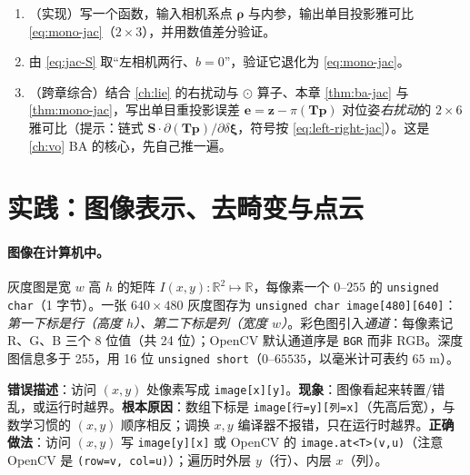 \begin{practice}
\begin{enumerate}
  \item （实现）写一个函数，输入相机系点 $\boldsymbol\rho$ 与内参，输出单目投影雅可比 \cref{eq:mono-jac}（$2\times3$），并用数值差分验证。
  \item 由 \cref{eq:jac-S} 取“左相机两行、$b=0$”，验证它退化为 \cref{eq:mono-jac}。
  \item （跨章综合）结合 \cref{ch:lie} 的右扰动与 $\odot$ 算子、本章 \cref{thm:ba-jac} 与 \cref{thm:mono-jac}，写出单目重投影误差 $\mathbf{e}=\mathbf{z}-\pi(\mathbf{T}\mathbf{p})$ 对位姿\emph{右扰动}的 $2\times6$ 雅可比（提示：链式 $\mathbf{S}\cdot\partial(\mathbf{T}\mathbf{p})/\partial\delta\boldsymbol\xi$，符号按 \cref{eq:left-right-jac}）。这是 \cref{ch:vo} BA 的核心，先自己推一遍。
\end{enumerate}
\end{practice}

\section{实践：图像表示、去畸变与点云}
\label{sec:cam-practice}

\paragraph{图像在计算机中。}
灰度图是宽 $w$ 高 $h$ 的矩阵 $I(x,y):\mathbb{R}^2\mapsto\mathbb{R}$，每像素一个 $0\text{–}255$ 的 \texttt{unsigned char}（1 字节）\cite{gaoxiang2019slam14}。一张 $640\times480$ 灰度图存为 \texttt{unsigned char image[480][640]}：\emph{第一下标是行（高度 $h$）、第二下标是列（宽度 $w$）}。彩色图引入\emph{通道}：每像素记 R、G、B 三个 8 位值（共 24 位）；OpenCV 默认通道序是 \texttt{BGR} 而非 RGB。深度图信息多于 255，用 16 位 \texttt{unsigned short}（$0\text{–}65535$，以毫米计可表约 $65$ m）。

\begin{pitfall}
\textbf{错误描述}：访问 $(x,y)$ 处像素写成 \texttt{image[x][y]}。\textbf{现象}：图像看起来转置/错乱，或运行时越界。\textbf{根本原因}：数组下标是 \texttt{image[行=y][列=x]}（先高后宽），与数学习惯的 $(x,y)$ 顺序相反；调换 $x,y$ 编译器不报错，只在运行时越界\cite{gaoxiang2019slam14}。\textbf{正确做法}：访问 $(x,y)$ 写 \texttt{image[y][x]} 或 OpenCV 的 \texttt{image.at<T>(v,u)}（注意 OpenCV 是 \texttt{(row=v, col=u)}）；遍历时外层 $y$（行）、内层 $x$（列）。
\end{pitfall}

